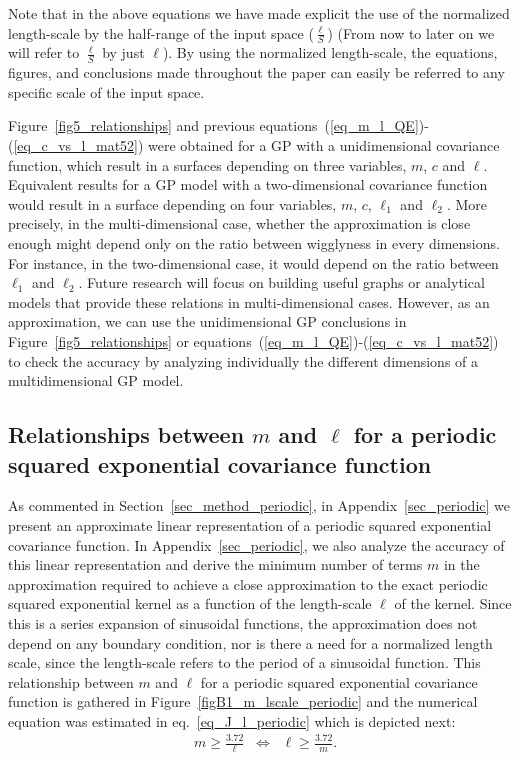 {\color{blue}Note that in the above equations we have made explicit the use of the normalized length-scale by the half-range of the input space ($\frac{\ell}{S}$) (From now to later on we will refer to $\frac{\ell}{S}$ by just $\ell$). By using the normalized length-scale, the equations, figures, and conclusions made throughout the paper can easily be referred to any specific scale of the input space.}

Figure~\ref{fig5_relationships} and previous equations~(\ref{eq_m_l_QE})-(\ref{eq_c_vs_l_mat52}) were obtained for a GP with a unidimensional covariance function, which result in a surfaces depending on three variables, $m$, $c$ and $\ell$. Equivalent results for a GP model with a two-dimensional covariance function would result in a surface depending on four variables, $m$, $c$, $\ell_1$ and $\ell_2$. More precisely, in the multi-dimensional case, whether the approximation is close enough might depend only on the ratio between wigglyness in every dimensions. For instance, in the two-dimensional case, it would depend on the ratio between $\ell_1$ and $\ell_2$. Future research will focus on building useful graphs or analytical models that provide these relations in multi-dimensional cases. However, as an approximation, we can use the unidimensional GP conclusions in Figure~\ref{fig5_relationships} or equations~(\ref{eq_m_l_QE})-(\ref{eq_c_vs_l_mat52}) to check the accuracy by analyzing individually the different dimensions of a multidimensional GP model.

\subsection{Relationships between $m$ and $\ell$ for a periodic squared exponential covariance function} \label{subsec_empiric_relations_periodic}

As commented in Section~\ref{sec_method_periodic}, in Appendix~\ref{sec_periodic} we present an approximate linear representation of a periodic squared exponential covariance function. In Appendix~\ref{sec_periodic}, we also analyze the accuracy of this linear representation and derive the minimum number of terms $m$ in the approximation required to achieve a close approximation to the exact periodic squared exponential kernel as a function of the length-scale $\ell$ of the kernel. Since this is a series expansion of sinusoidal functions, the approximation does not depend on any boundary condition{\color{blue}, nor is there a need for a normalized length scale, since the length-scale refers to the period of a sinusoidal function}. This relationship between $m$ and $\ell$ for a periodic squared exponential covariance function is gathered in Figure~\ref{figB1_m_lscale_periodic} and the numerical equation was estimated in eq.~\eqref{eq_J_l_periodic} which is depicted next:
%
\begin{align*}
&m \geq \frac{3.72}{\ell} \;\; \Leftrightarrow \;\; \ell \geq \frac{3.72}{m} .
\end{align*}

